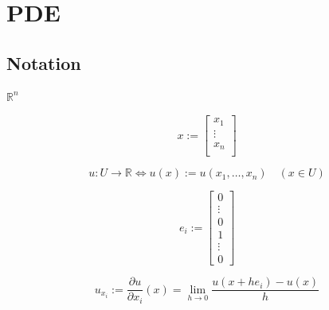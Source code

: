 \documentclass{blog}
\begin{document}
\section{PDE}
\subsection{Notation}
\begin{definition}
    $\mathbb{R}^{n}$
\end{definition}

\begin{definition}
    \begin{equation}
        \label{eq:x}
        x :=
        \begin{bmatrix}
            x_{1} \\ \vdots \\ x_{n}  \\
        \end{bmatrix}
    \end{equation}
\end{definition}

\begin{definition}[$u(x)$]
    \begin{equation}
        \label{eq:u}
        u : U \to \mathbb{R} \Leftrightarrow u(x) := u(x_{1}, \ldots, x_{n}) \quad (x \in U)
    \end{equation}
\end{definition}

\begin{definition}
    \begin{equation}
        \label{eq:ei}
        e_{i} :=
        \begin{bmatrix}
            0 \\ \vdots \\ 0 \\ 1 \\ \vdots \\ 0
        \end{bmatrix}
    \end{equation}
\end{definition}

\begin{definition}[derivative]
    \begin{equation}
        \label{eq:derivative}
        u_{x_{i}} := \frac{\partial u}{\partial x_{i}}(x) = \lim_{h \to 0} \frac{u(x+he_{i}) - u(x)}{h}
    \end{equation}
\end{definition}
\end{document}
